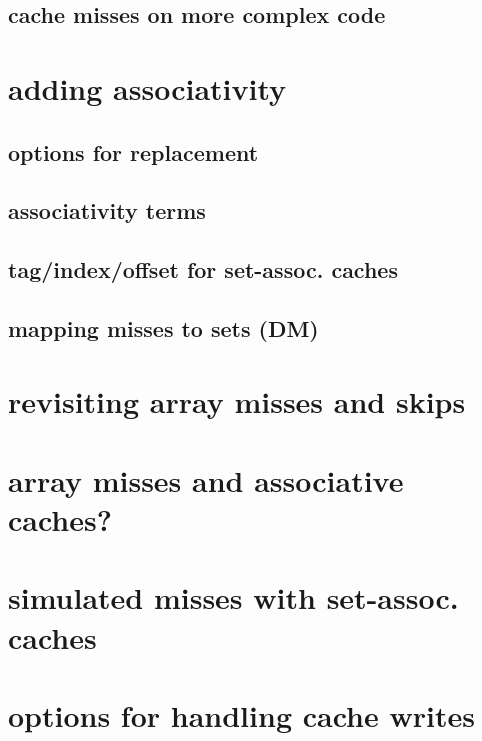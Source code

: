 \subsection{cache misses on more complex code}


\section{adding associativity}



\subsection{options for replacement}



\subsection{associativity terms}


\subsection{tag/index/offset for set-assoc. caches}


\subsection{mapping misses to sets (DM)}


\section{revisiting array misses and skips}

\section{array misses and associative caches?}


\section{simulated misses with set-assoc. caches}


\section{options for handling cache writes}


